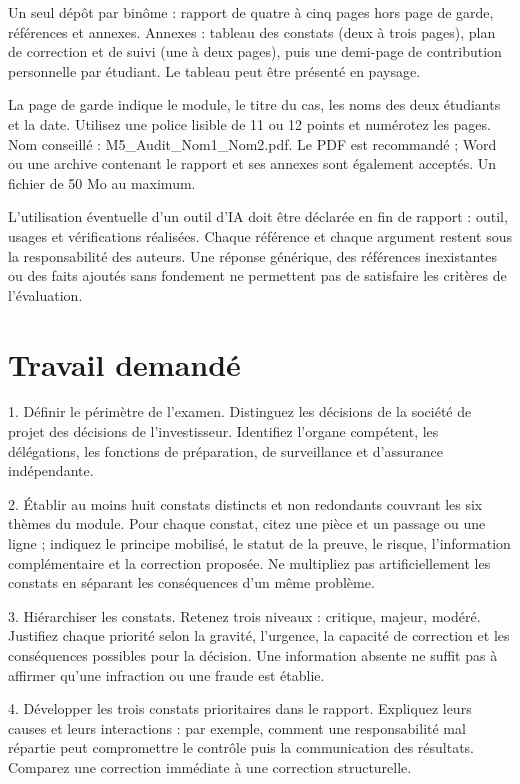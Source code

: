 \documentclass[11pt,a4paper]{article}
\begin{document}
Un seul dépôt par binôme : rapport de quatre à cinq pages hors page de garde, références et annexes. Annexes : tableau des constats (deux à trois pages), plan de correction et de suivi (une à deux pages), puis une demi-page de contribution personnelle par étudiant. Le tableau peut être présenté en paysage.

La page de garde indique le module, le titre du cas, les noms des deux étudiants et la date. Utilisez une police lisible de 11 ou 12 points et numérotez les pages. Nom conseillé : M5\_Audit\_Nom1\_Nom2.pdf. Le PDF est recommandé ; Word ou une archive contenant le rapport et ses annexes sont également acceptés. Un fichier de 50 Mo au maximum.

L’utilisation éventuelle d’un outil d’IA doit être déclarée en fin de rapport : outil, usages et vérifications réalisées. Chaque référence et chaque argument restent sous la responsabilité des auteurs. Une réponse générique, des références inexistantes ou des faits ajoutés sans fondement ne permettent pas de satisfaire les critères de l’évaluation.

\section{Travail demandé}
1. Définir le périmètre de l’examen. Distinguez les décisions de la société de projet des décisions de l’investisseur. Identifiez l’organe compétent, les délégations, les fonctions de préparation, de surveillance et d’assurance indépendante.

2. Établir au moins huit constats distincts et non redondants couvrant les six thèmes du module. Pour chaque constat, citez une pièce et un passage ou une ligne ; indiquez le principe mobilisé, le statut de la preuve, le risque, l’information complémentaire et la correction proposée. Ne multipliez pas artificiellement les constats en séparant les conséquences d’un même problème.

3. Hiérarchiser les constats. Retenez trois niveaux : critique, majeur, modéré. Justifiez chaque priorité selon la gravité, l’urgence, la capacité de correction et les conséquences possibles pour la décision. Une information absente ne suffit pas à affirmer qu’une infraction ou une fraude est établie.

4. Développer les trois constats prioritaires dans le rapport. Expliquez leurs causes et leurs interactions : par exemple, comment une responsabilité mal répartie peut compromettre le contrôle puis la communication des résultats. Comparez une correction immédiate à une correction structurelle.
\end{document}
